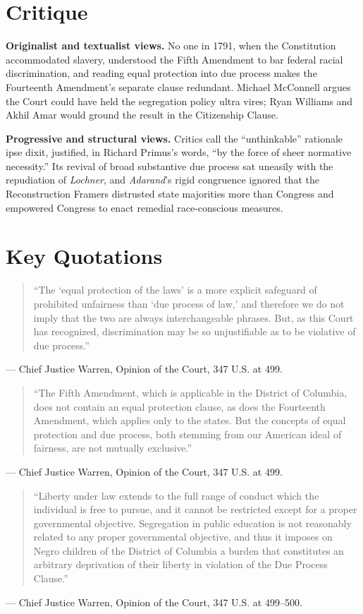 \documentclass[12pt]{article}
\begin{document}
\section{Critique}

\textbf{Originalist and textualist views.} No one in 1791, when the Constitution accommodated slavery, understood the Fifth Amendment to bar federal racial discrimination, and reading equal protection into due process makes the Fourteenth Amendment's separate clause redundant. Michael McConnell argues the Court could have held the segregation policy ultra vires; Ryan Williams and Akhil Amar would ground the result in the Citizenship Clause.

\textbf{Progressive and structural views.} Critics call the ``unthinkable'' rationale ipse dixit, justified, in Richard Primus's words, ``by the force of sheer normative necessity.'' Its revival of broad substantive due process sat uneasily with the repudiation of \textit{Lochner}, and \textit{Adarand}'s rigid congruence ignored that the Reconstruction Framers distrusted state majorities more than Congress and empowered Congress to enact remedial race-conscious measures.

\section{Key Quotations}

\begin{quote}
``The `equal protection of the laws' is a more explicit safeguard of prohibited unfairness than `due process of law,' and therefore we do not imply that the two are always interchangeable phrases. But, as this Court has recognized, discrimination may be so unjustifiable as to be violative of due process.''
\end{quote}
\noindent --- Chief Justice Warren, Opinion of the Court, 347 U.S. at 499.

\begin{quote}
``The Fifth Amendment, which is applicable in the District of Columbia, does not contain an equal protection clause, as does the Fourteenth Amendment, which applies only to the states. But the concepts of equal protection and due process, both stemming from our American ideal of fairness, are not mutually exclusive.''
\end{quote}
\noindent --- Chief Justice Warren, Opinion of the Court, 347 U.S. at 499.

\begin{quote}
``Liberty under law extends to the full range of conduct which the individual is free to pursue, and it cannot be restricted except for a proper governmental objective. Segregation in public education is not reasonably related to any proper governmental objective, and thus it imposes on Negro children of the District of Columbia a burden that constitutes an arbitrary deprivation of their liberty in violation of the Due Process Clause.''
\end{quote}
\noindent --- Chief Justice Warren, Opinion of the Court, 347 U.S. at 499--500.
\end{document}
